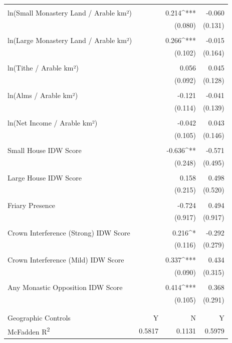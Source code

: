 \begin{table}[H]
\begin{tabular}{@{\extracolsep{.5pt}}lD{.}{.}{-3} D{.}{.}{-3} D{.}{.}{-3} }
  & & & \\ 
 ln(Small Monastery Land / Arable km²) &  & 0.214^{***} & -0.060 \\ 
  &  & (0.080) & (0.131) \\ 
  & & & \\ 
 ln(Large Monastery Land / Arable km²) &  & 0.266^{***} & -0.015 \\ 
  &  & (0.102) & (0.164) \\ 
  & & & \\ 
 ln(Tithe / Arable km²) &  & 0.056 & 0.045 \\ 
  &  & (0.092) & (0.128) \\ 
  & & & \\ 
 ln(Alms / Arable km²) &  & -0.121 & -0.041 \\ 
  &  & (0.114) & (0.139) \\ 
  & & & \\ 
 ln(Net Income / Arable km²) &  & -0.042 & 0.043 \\ 
  &  & (0.105) & (0.146) \\ 
  & & & \\ 
 Small House IDW Score &  & -0.636^{**} & -0.571 \\ 
  &  & (0.248) & (0.495) \\ 
  & & & \\ 
 Large House IDW Score &  & 0.158 & 0.498 \\ 
  &  & (0.215) & (0.520) \\ 
  & & & \\ 
 Friary Presence &  & -0.724 & 0.494 \\ 
  &  & (0.917) & (0.917) \\ 
  & & & \\ 
 Crown Interference (Strong) IDW Score &  & 0.216^{*} & -0.292 \\ 
  &  & (0.116) & (0.279) \\ 
  & & & \\ 
 Crown Interference (Mild) IDW Score &  & 0.337^{***} & 0.434 \\ 
  &  & (0.090) & (0.315) \\ 
  & & & \\ 
 Any Monastic Opposition IDW Score &  & 0.414^{***} & 0.368 \\ 
  &  & (0.105) & (0.291) \\ 
  & & & \\ 
\hline \\[-1.8ex] 
Geographic Controls & Y & N & Y \\ 
McFadden R\textsuperscript{2} & 0.5817 & 0.1131 & 0.5979 \\ 

\end{tabular}
\end{table}
